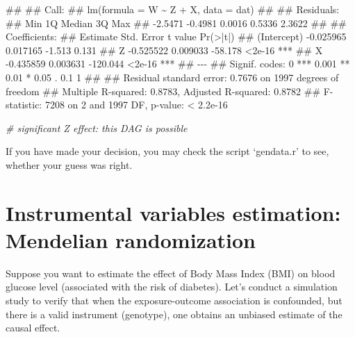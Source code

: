 \documentclass[
]{book}
\newenvironment{Shaded}{\begin{snugshade}}{\end{snugshade}}
\newcommand{\CommentTok}[1]{\textcolor[rgb]{0.56,0.35,0.01}{\textit{#1}}}
\newcommand{\NormalTok}[1]{#1}
\begin{document}
\begin{Shaded}
\begin{Highlighting}[]
\NormalTok{\#\# }
\NormalTok{\#\# Call:}
\NormalTok{\#\# lm(formula = W \textasciitilde{} Z + X, data = dat)}
\NormalTok{\#\# }
\NormalTok{\#\# Residuals:}
\NormalTok{\#\#     Min      1Q  Median      3Q     Max }
\NormalTok{\#\# {-}2.5471 {-}0.4981  0.0016  0.5336  2.3622 }
\NormalTok{\#\# }
\NormalTok{\#\# Coefficients:}
\NormalTok{\#\#              Estimate Std. Error  t value Pr(\textgreater{}|t|)    }
\NormalTok{\#\# (Intercept) {-}0.025965   0.017165   {-}1.513    0.131    }
\NormalTok{\#\# Z           {-}0.525522   0.009033  {-}58.178   \textless{}2e{-}16 ***}
\NormalTok{\#\# X           {-}0.435859   0.003631 {-}120.044   \textless{}2e{-}16 ***}
\NormalTok{\#\# {-}{-}{-}}
\NormalTok{\#\# Signif. codes:  0 \textquotesingle{}***\textquotesingle{} 0.001 \textquotesingle{}**\textquotesingle{} 0.01 \textquotesingle{}*\textquotesingle{} 0.05 \textquotesingle{}.\textquotesingle{} 0.1 \textquotesingle{} \textquotesingle{} 1}
\NormalTok{\#\# }
\NormalTok{\#\# Residual standard error: 0.7676 on 1997 degrees of freedom}
\NormalTok{\#\# Multiple R{-}squared:  0.8783, Adjusted R{-}squared:  0.8782 }
\NormalTok{\#\# F{-}statistic:  7208 on 2 and 1997 DF,  p{-}value: \textless{} 2.2e{-}16}
\end{Highlighting}
\end{Shaded}

\begin{Shaded}
\begin{Highlighting}[]
\CommentTok{\# significant Z effect: this DAG is possible}
\end{Highlighting}
\end{Shaded}

If you have made your decision, you may check the script `gendata.r' to see, whether your guess was right.

\section{Instrumental variables estimation: Mendelian randomization}\label{instrumental-variables-estimation-mendelian-randomization}

Suppose you want to estimate the effect of Body Mass Index (BMI) on blood glucose level (associated with the risk of diabetes).
Let's conduct a simulation study to verify that when the exposure-outcome association is confounded, but there is a valid instrument (genotype), one obtains an unbiased estimate of the causal effect.
\end{document}
